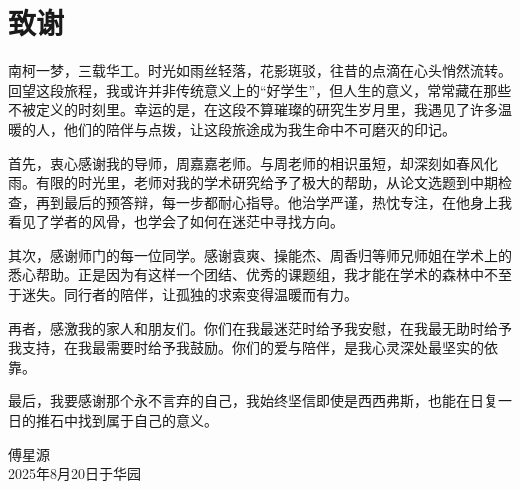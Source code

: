 \chapter{致\texorpdfstring{\quad}{}谢}
南柯一梦，三载华工。时光如雨丝轻落，花影斑驳，往昔的点滴在心头悄然流转。回望这段旅程，我或许并非传统意义上的“好学生”，但人生的意义，常常藏在那些不被定义的时刻里。幸运的是，在这段不算璀璨的研究生岁月里，我遇见了许多温暖的人，他们的陪伴与点拨，让这段旅途成为我生命中不可磨灭的印记。

首先，衷心感谢我的导师，周嘉嘉老师。与周老师的相识虽短，却深刻如春风化雨。有限的时光里，老师对我的学术研究给予了极大的帮助，从论文选题到中期检查，再到最后的预答辩，每一步都耐心指导。他治学严谨，热忱专注，在他身上我看见了学者的风骨，也学会了如何在迷茫中寻找方向。

其次，感谢师门的每一位同学。感谢袁爽、操能杰、周香归等师兄师姐在学术上的悉心帮助。正是因为有这样一个团结、优秀的课题组，我才能在学术的森林中不至于迷失。同行者的陪伴，让孤独的求索变得温暖而有力。

再者，感激我的家人和朋友们。你们在我最迷茫时给予我安慰，在我最无助时给予我支持，在我最需要时给予我鼓励。你们的爱与陪伴，是我心灵深处最坚实的依靠。

最后，我要感谢那个永不言弃的自己，我始终坚信即使是西西弗斯，也能在日复一日的推石中找到属于自己的意义。
\begin{flushright}
  傅星源\\
  2025年8月20日于华园
\end{flushright}

